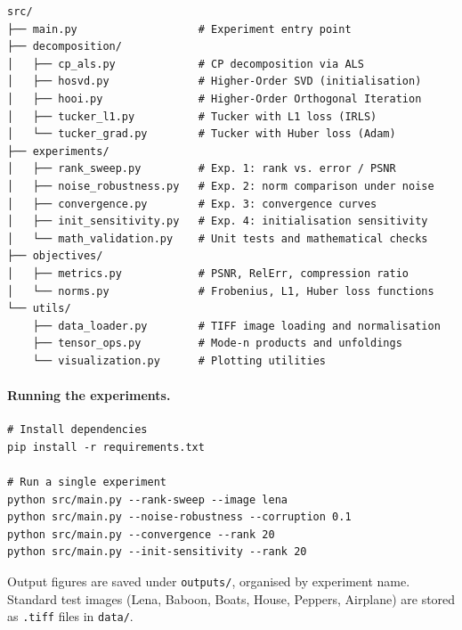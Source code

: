 \begin{verbatim}
src/
├── main.py                   # Experiment entry point
├── decomposition/
│   ├── cp_als.py             # CP decomposition via ALS
│   ├── hosvd.py              # Higher-Order SVD (initialisation)
│   ├── hooi.py               # Higher-Order Orthogonal Iteration
│   ├── tucker_l1.py          # Tucker with L1 loss (IRLS)
│   └── tucker_grad.py        # Tucker with Huber loss (Adam)
├── experiments/
│   ├── rank_sweep.py         # Exp. 1: rank vs. error / PSNR
│   ├── noise_robustness.py   # Exp. 2: norm comparison under noise
│   ├── convergence.py        # Exp. 3: convergence curves
│   ├── init_sensitivity.py   # Exp. 4: initialisation sensitivity
│   └── math_validation.py    # Unit tests and mathematical checks
├── objectives/
│   ├── metrics.py            # PSNR, RelErr, compression ratio
│   └── norms.py              # Frobenius, L1, Huber loss functions
└── utils/
    ├── data_loader.py        # TIFF image loading and normalisation
    ├── tensor_ops.py         # Mode-n products and unfoldings
    └── visualization.py      # Plotting utilities
\end{verbatim}

\paragraph{Running the experiments.}

\begin{verbatim}
# Install dependencies
pip install -r requirements.txt

# Run a single experiment
python src/main.py --rank-sweep --image lena
python src/main.py --noise-robustness --corruption 0.1
python src/main.py --convergence --rank 20
python src/main.py --init-sensitivity --rank 20
\end{verbatim}

Output figures are saved under \texttt{outputs/}, organised by experiment name.
Standard test images (Lena, Baboon, Boats, House, Peppers, Airplane) are
stored as \texttt{.tiff} files in \texttt{data/}.
